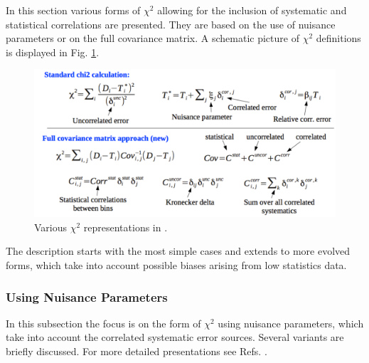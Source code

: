 \label{sec:error}
\label{sec:chi2}
In this section various forms of $\chi^2$ 
allowing for the inclusion of systematic and statistical correlations are presented.
They are based on the use of nuisance parameters or on the full covariance matrix.
A schematic picture of $\chi^2$ definitions is displayed in Fig. \ref{fig:chi2}.
\begin{figure}[htb]
\centerline{
\includegraphics[width=0.75\linewidth]{figures/chi2.pdf}
}
\caption{Various $\chi^2$ representations in \fitter.}
\label{fig:chi2}
\end{figure}
The description starts with the most simple cases and extends to more evolved forms, which take into account possible biases 
arising from low statistics data.

\subsubsection{Using Nuisance Parameters}

\newcommand{\rs}{b}
\newcommand{\ce}{\Gamma}
\newcommand\ci{\alpha} \newcommand\ck{\beta}


In this subsection the focus is on the form of $\chi^2$
using nuisance parameters,
which take into account the correlated systematic error sources.
Several variants are briefly discussed.
For more detailed presentations see Refs. \cite{Stump:2001gu,Botje:2001fx,Aaron:2009bp}.

